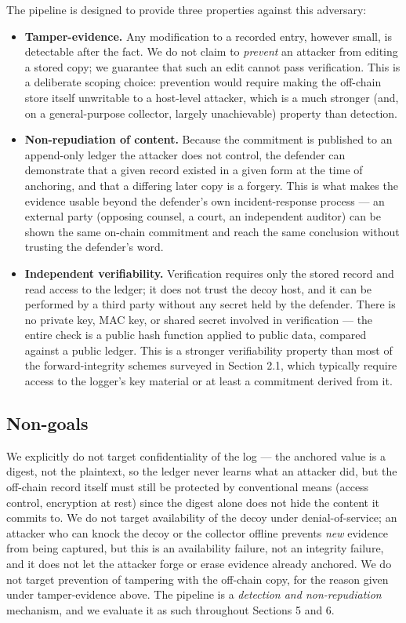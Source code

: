 \documentclass[journal]{IEEEtran}
\begin{document}
The pipeline is designed to provide three properties against this adversary:

\begin{itemize}
\item \textbf{Tamper-evidence.} Any modification to a recorded entry, however small, is detectable after the fact. We do not claim to \emph{prevent} an attacker from editing a stored copy; we guarantee that such an edit cannot pass verification. This is a deliberate scoping choice: prevention would require making the off-chain store itself unwritable to a host-level attacker, which is a much stronger (and, on a general-purpose collector, largely unachievable) property than detection.
\item \textbf{Non-repudiation of content.} Because the commitment is published to an append-only ledger the attacker does not control, the defender can demonstrate that a given record existed in a given form at the time of anchoring, and that a differing later copy is a forgery. This is what makes the evidence usable beyond the defender's own incident-response process --- an external party (opposing counsel, a court, an independent auditor) can be shown the same on-chain commitment and reach the same conclusion without trusting the defender's word.
\item \textbf{Independent verifiability.} Verification requires only the stored record and read access to the ledger; it does not trust the decoy host, and it can be performed by a third party without any secret held by the defender. There is no private key, MAC key, or shared secret involved in verification --- the entire check is a public hash function applied to public data, compared against a public ledger. This is a stronger verifiability property than most of the forward-integrity schemes surveyed in Section 2.1, which typically require access to the logger's key material or at least a commitment derived from it.
\end{itemize}

\subsection{Non-goals}

We explicitly do not target confidentiality of the log --- the anchored value is a digest, not the plaintext, so the ledger never learns what an attacker did, but the off-chain record itself must still be protected by conventional means (access control, encryption at rest) since the digest alone does not hide the content it commits to. We do not target availability of the decoy under denial-of-service; an attacker who can knock the decoy or the collector offline prevents \emph{new} evidence from being captured, but this is an availability failure, not an integrity failure, and it does not let the attacker forge or erase evidence already anchored. We do not target prevention of tampering with the off-chain copy, for the reason given under tamper-evidence above. The pipeline is a \emph{detection and non-repudiation} mechanism, and we evaluate it as such throughout Sections 5 and 6.
\end{document}
